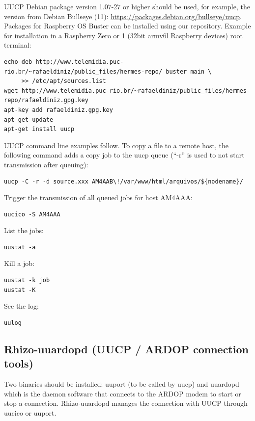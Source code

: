 \documentclass[11pt,a4paper]{article}
\begin{document}
UUCP Debian package version 1.07-27 or higher should be used, for example,
the version from Debian Bullseye (11):
\url{https://packages.debian.org/bullseye/uucp}. Packages for Raspberry OS
Buster can be installed using our repository. Example for installation in a
Raspberry Zero or 1 (32bit armv6l Raspberry devices) root terminal:

\begin{verbatim}
echo deb http://www.telemidia.puc-rio.br/~rafaeldiniz/public_files/hermes-repo/ buster main \
     >> /etc/apt/sources.list
wget http://www.telemidia.puc-rio.br/~rafaeldiniz/public_files/hermes-repo/rafaeldiniz.gpg.key
apt-key add rafaeldiniz.gpg.key
apt-get update
apt-get install uucp
\end{verbatim}


UUCP command line examples follow. To copy a file to a remote host,
the following command adds a copy job to the uucp queue (``-r'' is used to
not start transmission after queuing):
\begin{verbatim}
uucp -C -r -d source.xxx AM4AAB\!/var/www/html/arquivos/${nodename}/
\end{verbatim}

Trigger the transmission of all queued jobs for host
AM4AAA:
\begin{verbatim}
uucico -S AM4AAA
\end{verbatim}

List the jobs:
\begin{verbatim}
uustat -a
\end{verbatim}

Kill a job:
\begin{verbatim}
uustat -k job
uustat -K
\end{verbatim}

See the log:
\begin{verbatim}
uulog
\end{verbatim}


\subsection{Rhizo-uuardopd (UUCP / ARDOP connection tools)}


Two binaries should be installed: uuport (to be called by uucp) and uuardopd
which is the daemon software that connects to the ARDOP modem to start
or stop a connection. Rhizo-uuardopd manages the connection with UUCP
through uucico or uuport.
\end{document}
